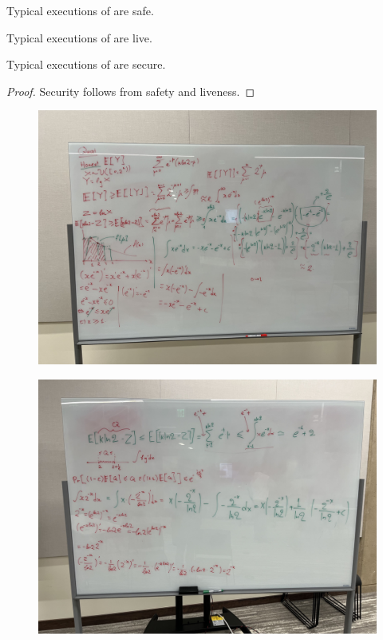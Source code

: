 \begin{conjecture}
  Typical executions of \poem are safe.
\end{conjecture}

\begin{conjecture}
  Typical executions of \poem are live.
\end{conjecture}

\begin{corollary}
  Typical executions of \poem are secure.
\end{corollary}
\begin{proof}
  Security follows from safety and liveness.
  \Qed
\end{proof}

\begin{figure}[h]
    \centering
    \includegraphics[width=1\textwidth]{figures/bounds-1.jpeg}
\end{figure}

\begin{figure}[h]
    \centering
    \includegraphics[width=1\textwidth]{figures/bounds-2.jpeg}
\end{figure}
